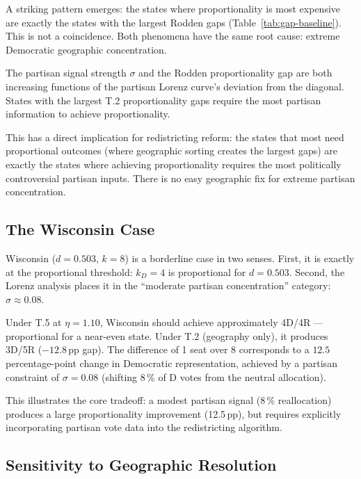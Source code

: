 A striking pattern emerges: the states where proportionality is most expensive
are exactly the states with the largest Rodden gaps (Table~\ref{tab:gap-baseline}).
This is not a coincidence. Both phenomena have the same root cause: extreme
Democratic geographic concentration.

\begin{proposition}
\label{prop:rodden-sigma}
The partisan signal strength $\sigma$ and the Rodden proportionality gap are
both increasing functions of the partisan Lorenz curve's deviation from the
diagonal. States with the largest T.2 proportionality gaps require the most
partisan information to achieve proportionality.
\end{proposition}

This has a direct implication for redistricting reform: the states that most
need proportional outcomes (where geographic sorting creates the largest gaps)
are exactly the states where achieving proportionality requires the most
politically controversial partisan inputs. There is no easy geographic fix
for extreme partisan concentration.

\subsection{The Wisconsin Case}

Wisconsin ($d = 0.503$, $k=8$) is a borderline case in two senses.
First, it is exactly at the proportional threshold: $k_D = 4$ is proportional
for $d = 0.503$.
Second, the Lorenz analysis places it in the ``moderate partisan concentration''
category: $\sigma \approx 0.08$.

Under T.5 at $\eta = 1.10$, Wisconsin should achieve approximately 4D/4R ---
proportional for a near-even state.
Under T.2 (geography only), it produces 3D/5R ($-12.8$\,pp gap).
The difference of 1 seat over 8 corresponds to a $12.5$ percentage-point
change in Democratic representation, achieved by a partisan constraint
of $\sigma = 0.08$ (shifting 8\,\% of D votes from the neutral allocation).

This illustrates the core tradeoff: a modest partisan signal (8\,\% reallocation)
produces a large proportionality improvement (12.5\,pp), but requires
explicitly incorporating partisan vote data into the redistricting algorithm.

\subsection{Sensitivity to Geographic Resolution}
\label{sec:compromise:maup}

